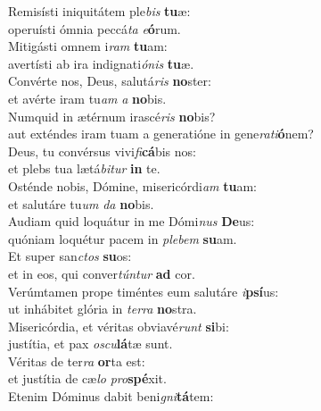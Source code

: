 \evenverse Remisísti iniquitátem ple\textit{bis} \textbf{tu}æ:~\*\\
\evenverse operuísti ómnia peccá\textit{ta} \textit{e}\textbf{ó}rum.\\
\oddverse Mitigásti omnem i\textit{ram} \textbf{tu}am:~\*\\
\oddverse avertísti ab ira indignati\textit{ó}\textit{nis} \textbf{tu}æ.\\
\evenverse Convérte nos, Deus, salutá\textit{ris} \textbf{no}ster:~\*\\
\evenverse et avérte iram tu\textit{am} \textit{a} \textbf{no}bis.\\
\oddverse Numquid in ætérnum irascé\textit{ris} \textbf{no}bis?~\*\\
\oddverse aut exténdes iram tuam a generatióne in gene\textit{ra}\textit{ti}\textbf{ó}nem?\\
\evenverse Deus, tu convérsus vivi\textit{fi}\textbf{cá}bis nos:~\*\\
\evenverse et plebs tua lætá\textit{bi}\textit{tur} \textbf{in} te.\\
\oddverse Osténde nobis, Dómine, misericórdi\textit{am} \textbf{tu}am:~\*\\
\oddverse et salutáre tu\textit{um} \textit{da} \textbf{no}bis.\\
\evenverse Audiam quid loquátur in me Dómi\textit{nus} \textbf{De}us:~\*\\
\evenverse quóniam loquétur pacem in \textit{ple}\textit{bem} \textbf{su}am.\\
\oddverse Et super san\textit{ctos} \textbf{su}os:~\*\\
\oddverse et in eos, qui conver\textit{tún}\textit{tur} \textbf{ad} cor.\\
\evenverse Verúmtamen prope timéntes eum salutáre \textit{i}\textbf{psí}us:~\*\\
\evenverse ut inhábitet glória in \textit{ter}\textit{ra} \textbf{no}stra.\\
\oddverse Misericórdia, et véritas obviavé\textit{runt} \textbf{si}bi:~\*\\
\oddverse justítia, et pax \textit{o}\textit{scu}\textbf{lá}tæ sunt.\\
\evenverse Véritas de ter\textit{ra} \textbf{or}ta est:~\*\\
\evenverse et justítia de cæ\textit{lo} \textit{pro}\textbf{spé}xit.\\
\oddverse Etenim Dóminus dabit beni\textit{gni}\textbf{tá}tem:~\*\\

